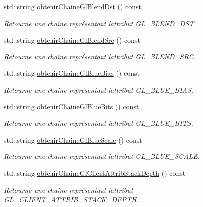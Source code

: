 \begin{DoxyCompactItemize}
std\+::string \hyperlink{group__utilitaire_gaa52ab39bcb62d4f8777afddfca458650}{obtenir\+Chaine\+Gl\+Blend\+Dst} () const 
\begin{DoxyCompactList}\small\item\em Retourne une chaîne représentant l\textquotesingle{}attribut G\+L\+\_\+\+B\+L\+E\+N\+D\+\_\+\+D\+S\+T. \end{DoxyCompactList}\item 
std\+::string \hyperlink{group__utilitaire_ga510a36fe5d3e313756e40b5c67b516ba}{obtenir\+Chaine\+Gl\+Blend\+Src} () const 
\begin{DoxyCompactList}\small\item\em Retourne une chaîne représentant l\textquotesingle{}attribut G\+L\+\_\+\+B\+L\+E\+N\+D\+\_\+\+S\+R\+C. \end{DoxyCompactList}\item 
std\+::string \hyperlink{group__utilitaire_ga95f9a6baabd65a0cdd4b1e5cbeb4f678}{obtenir\+Chaine\+Gl\+Blue\+Bias} () const 
\begin{DoxyCompactList}\small\item\em Retourne une chaîne représentant l\textquotesingle{}attribut G\+L\+\_\+\+B\+L\+U\+E\+\_\+\+B\+I\+A\+S. \end{DoxyCompactList}\item 
std\+::string \hyperlink{group__utilitaire_ga125172f1c5c4ef27c20c4e52a70ce38a}{obtenir\+Chaine\+Gl\+Blue\+Bits} () const 
\begin{DoxyCompactList}\small\item\em Retourne une chaîne représentant l\textquotesingle{}attribut G\+L\+\_\+\+B\+L\+U\+E\+\_\+\+B\+I\+T\+S. \end{DoxyCompactList}\item 
std\+::string \hyperlink{group__utilitaire_ga8422f585aba4fc07dcaac22e6cf587b3}{obtenir\+Chaine\+Gl\+Blue\+Scale} () const 
\begin{DoxyCompactList}\small\item\em Retourne une chaîne représentant l\textquotesingle{}attribut G\+L\+\_\+\+B\+L\+U\+E\+\_\+\+S\+C\+A\+L\+E. \end{DoxyCompactList}\item 
std\+::string \hyperlink{group__utilitaire_gad57f6d8da9cffeae2204a77e6e5f9292}{obtenir\+Chaine\+Gl\+Client\+Attrib\+Stack\+Depth} () const 
\begin{DoxyCompactList}\small\item\em Retourne une chaîne représentant l\textquotesingle{}attribut G\+L\+\_\+\+C\+L\+I\+E\+N\+T\+\_\+\+A\+T\+T\+R\+I\+B\+\_\+\+S\+T\+A\+C\+K\+\_\+\+D\+E\+P\+T\+H. \end{DoxyCompactList}\item 

\end{DoxyCompactItemize}

